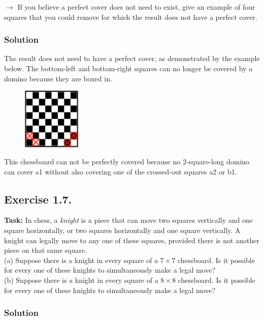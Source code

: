 \documentclass{article}
\begin{document}
\noindent $\longrightarrow$ If you believe a perfect cover does not need to exist, give an example of four squares that you could remove for which the result does not have a perfect cover.

\subsubsection*{Solution}

The result does not need to have a perfect cover, as demonstrated by the example below. The bottom-left and bottom-right squares can no longer be covered by a domino because they are boxed in.

\begin{figure}[htbp] \centering \includegraphics[width=0.25\textwidth]{images/1.6.jpg} %
\end{figure}

\noindent This chessboard can not be perfectly covered because no 2-square-long domino can cover a1 without also covering one of
the crossed-out squares a2 or b1.

\newpage

\subsection{Exercise 1.7.}
\textbf{Task:} In chess, a \textit{knight} is a piece that can move two squares vertically and one square horizontally, or two squares horizontally and one square vertically. A knight can legally move to any one of these squares, provided there is not another piece on that same square.\\

\noindent (a) Suppose there is a knight in every square of a $7 \times 7$ chessboard. Is it possible for every one of these knights to simultaneously make a legal move?\\

\noindent (b) Suppose there is a knight in every square of a $8 \times 8$ chessboard. Is it possible for every one of these knights to simultaneously make a legal move?

\subsubsection*{Solution}
\end{document}
